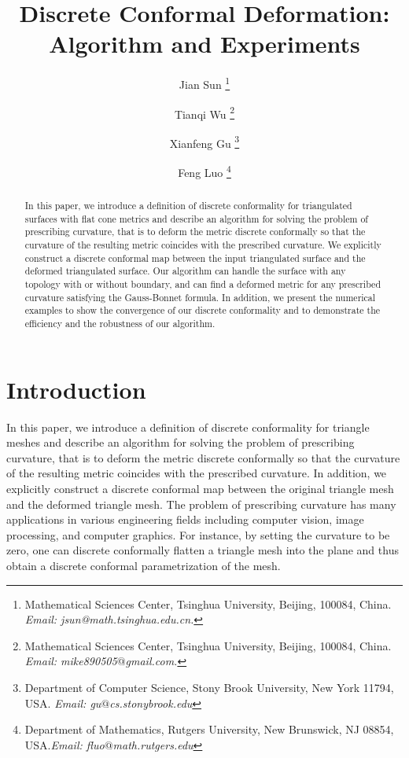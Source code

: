 \documentclass[11pt]{article}
\begin{document}
\title{Discrete Conformal Deformation: Algorithm and Experiments}

\author{ 
Jian Sun \thanks{Mathematical Sciences Center, Tsinghua University, Beijing, 100084, China. \textit{Email: jsun@math.tsinghua.edu.cn.}}
\and Tianqi Wu \thanks{Mathematical Sciences Center, Tsinghua University, Beijing, 100084, China. \textit{Email: mike890505$@$gmail.com.}}
\and Xianfeng Gu \thanks{Department of Computer Science, Stony Brook University, New York 11794, USA. \textit{Email:  gu$@$cs.stonybrook.edu}}
\and Feng Luo \thanks{Department of Mathematics, Rutgers University, New Brunswick, NJ 08854, USA.\textit{Email: fluo$@$math.rutgers.edu}}
}




\date{}


\maketitle

\begin{abstract}
In this paper, we introduce a definition of discrete conformality for
triangulated surfaces with flat cone metrics and describe an algorithm for solving the problem
of prescribing curvature, that is to deform the metric discrete conformally 
so that the curvature of the resulting metric coincides with the 
prescribed curvature. We explicitly construct a discrete conformal map 
between the input triangulated surface and the deformed triangulated surface.  
Our algorithm can handle the surface with any topology with or without boundary, 
and can find a deformed metric for any prescribed curvature  satisfying the 
Gauss-Bonnet formula. In addition, we present the numerical examples to show 
the convergence of 
our discrete conformality and to demonstrate the efficiency and the robustness
of our algorithm. 
\end{abstract}

\newpage
\section{Introduction}
In this paper, we introduce a definition of discrete conformality for
triangle meshes and describe an algorithm for solving the problem
of prescribing curvature, that is to deform the metric discrete conformally 
so that the curvature of the resulting metric coincides with the 
prescribed curvature. In addition, we explicitly construct a 
discrete conformal map between the original triangle mesh 
and the deformed triangle mesh. The problem of prescribing curvature
has many applications in various engineering fields including
computer vision, image processing, and computer graphics. 
For instance, by setting the curvature to be zero, one can discrete conformally
flatten a triangle mesh into the plane and thus obtain a discrete conformal 
parametrization of the mesh. 
\end{document}
